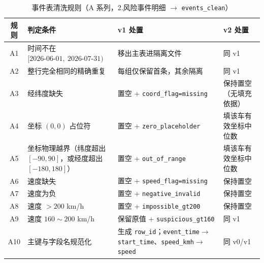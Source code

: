 \begin{table}[H]
\centering
\caption{事件表清洗规则（A 系列，2.风险事件明细 $\to$ \texttt{events\_clean}）}
\label{tab:rule-a}
\small
\begin{tabularx}{\textwidth}{cLLL}
\toprule
规则 & 判定条件 & v1 处置 & v2 处置 \\
\midrule
A1 & 时间不在 $[\text{2026-06-01},\ \text{2026-07-31})$ & 移出主表进隔离文件 & 同 v1 \\
A2 & 整行完全相同的精确重复 & 每组仅保留首条，其余隔离 & 同 v1 \\
A3 & 经纬度缺失 & 置空 + \texttt{coord\_flag=missing} & 保持置空（无填充依据） \\
A4 & 坐标 $(0,0)$ 占位符 & 置空 + \texttt{zero\_placeholder} & 填该车有效坐标中位数 \\
A5 & 坐标物理越界（纬度超出 $[-90,90]$，或经度超出 $[-180,180]$） & 置空 + \texttt{out\_of\_range} & 填该车有效坐标中位数 \\
A6 & 速度缺失 & 置空 + \texttt{speed\_flag=missing} & 保持置空 \\
A7 & 速度为负 & 置空 + \texttt{negative\_invalid} & 保持置空 \\
A8 & 速度 $>200$ km/h & 置空 + \texttt{impossible\_gt200} & 保持置空 \\
A9 & 速度 $160\sim200$ km/h & 保留原值 + \texttt{suspicious\_gt160} & 同 v1 \\
A10 & 主键与字段名规范化 & 生成 \texttt{row\_id}；\texttt{event\_time}$\to$\texttt{start\_time}、\texttt{speed\_kmh}$\to$\texttt{speed} & 同 v0/v1 \\
\bottomrule
\end{tabularx}
\end{table}

